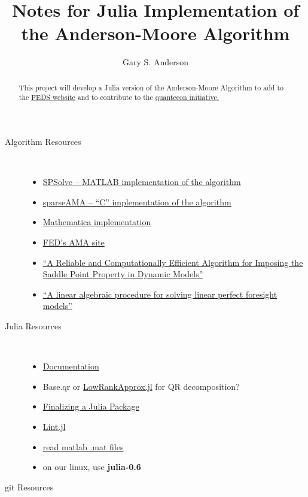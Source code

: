 \documentclass[12pt]{article}
\title{Notes for Julia Implementation of the Anderson-Moore Algorithm}
\author{Gary S. Anderson}
\begin{document}
\maketitle
\begin{abstract}
  This project will develop a Julia version of the Anderson-Moore Algorithm to add to the \href{https://www.federalreserve.gov/econres/ama-index.htm}{FEDS website}  and to contribute to the \href{http://quantecon.org/quantecon.jl}{quantecon initiative.}  
\end{abstract}
\begin{description}
\item[Algorithm Resources] \ 
\begin{itemize}
\item \href{https://github.com/es335mathwiz/SPSolve.git}{SPSolve -- MATLAB implementation of the algorithm}
\item \href{https://github.com/es335mathwiz/sparseAMA.git}{sparseAMA -- ``C'' implementation of the algorithm}
\item \href{https://github.com/es335mathwiz/mathAMA.git}{Mathematica implementation}
\item \href{https://www.federalreserve.gov/econres/ama-index.htm}{FED's AMA site}
\item \href{https://www.sciencedirect.com/science/article/pii/S1474667017405064}{``A Reliable and Computationally Efficient Algorithm for Imposing the Saddle Point Property in Dynamic Models''}
\item \href{https://www.sciencedirect.com/science/article/pii/0165176585902113}{``A linear algebraic procedure for solving linear perfect foresight models''}
\end{itemize}
\item[Julia Resources] \
  \begin{itemize}
  \item \href{https://docs.julialang.org/en/stable/}{Documentation}
  \item Base.qr or \href{https://github.com/JuliaMatrices/LowRankApprox.jl}{LowRankApprox.jl} for QR decomposition?
  \item \href{http://www.stochasticlifestyle.com/finalizing-julia-package-documentation-testing-coverage-publishing/}{Finalizing a Julia Package}
  \item \href{https://www.google.com/url?sa=t&rct=j&q=&esrc=s&source=web&cd=4&cad=rja&uact=8&ved=0ahUKEwjh_vH_h-DaAhUExYMKHYb7BWoQFgg5MAM&url=https%3A%2F%2Fgithub.com%2Ftonyhffong%2FLint.jl%2Fblob%2Fmaster%2Fdocs%2Ffeatures.md&usg=AOvVaw1FFQ9J64mhTjDx8QpQ-_zU}{Lint.jl}
 \item \href{https://github.com/JuliaIO/MAT.jl}{read matlab .mat files}
 \item on our linux, use  {\bf julia-0.6 }
  \end{itemize}
\newpage
\item[git Resources] \ 


\end{description}
\end{document}
